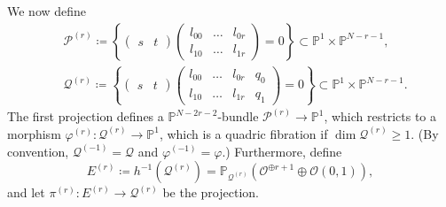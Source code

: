 \documentclass[10pt,a4paper]{amsart}
\theoremstyle{plain}
\theoremstyle{definition}
\let\phi\varphi
\renewcommand\P{\mathbb{P}}
\renewcommand\O{\mathcal{O}}
\begin{document}
We now define
\begin{align*}
&\mathcal{P}^{(r)}\coloneqq
\left\{
\begin{pmatrix}
s & t
\end{pmatrix}
\begin{pmatrix}
l_{00} & \dots &l_{0r}\\
l_{10} & \dots & l_{1r}
\end{pmatrix}
=0
\right\}
\subset \P^1\times \P^{N-r-1}, \\
&\mathcal{Q}^{(r)}
\coloneqq
\left\{
\begin{pmatrix}
s & t
\end{pmatrix}
\begin{pmatrix}
l_{00} & \dots &l_{0r} & q_0\\
l_{10} & \dots & l_{1r} & q_1
\end{pmatrix}
=0
\right\}
\subset \P^1\times \P^{N-r-1}.
\end{align*}
The first projection defines a $\P^{N-2r-2}$-bundle $\mathcal{P}^{(r)}\to \P^1$, which restricts to a morphism $\phi^{(r)}\colon \mathcal{Q}^{(r)}\to \P^1$, which is a quadric fibration if \(\dim\mathcal Q^{(r)} \geq 1\).
(By convention, $\mathcal{Q}^{(-1)}=\mathcal{Q}$ and $\phi^{(-1)}=\phi$.)
Furthermore, define
\[
E^{(r)}\coloneqq h^{-1}(\mathcal{Q}^{(r)})=\P_{\mathcal{Q}^{(r)}}(\O^{\oplus r+1}\oplus \O(0,1)),
\]
and let $\pi^{(r)}\colon E^{(r)}\to \mathcal{Q}^{(r)}$ be the projection.
\end{document}
